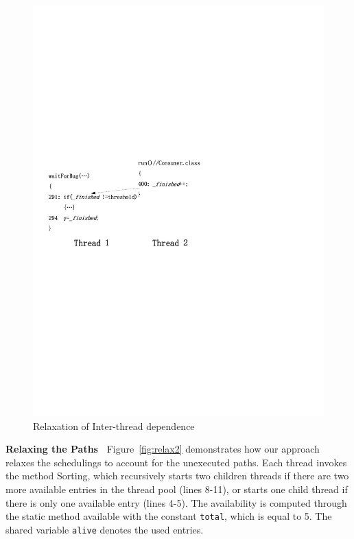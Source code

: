  

\begin{figure}[htp]
\centering
\includegraphics[scale=0.7]{cases/Visio-bbuffer.pdf}
\caption{Relaxation of Inter-thread dependence}\label{fig:relax1}
\end{figure}

{\bf Relaxing the Paths\ } Figure~\ref{fig:relax2} demonstrates how our approach relaxes the schedulings to account for the unexecuted paths. 
Each thread invokes the method {\sf Sorting}, which recursively starts two children threads if there are two more available entries in the thread pool (lines 8-11), or  starts one child thread if there is only one available entry (lines 4-5).  The availability is computed through the static method {\sf available} with the constant {\tt total}, which is equal to 5. The shared variable {\tt alive} denotes the used entries.

